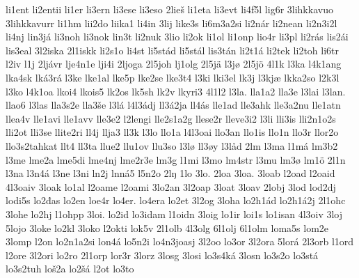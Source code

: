 {    li1ent
    li2entii
    li1er
    li3ern
    li3ese
    li3eso
    2lieš
    li1eta
    li3evt
    li4f5l
    lig6r
    3lihkkavuo
    3lihkkavurr
    li1hm
    lii2do
    liika1
    li4in
    3lij
    like3s
    li6m3a2si
    li2nár
    li2nean
    li2n3i2l
    li4nj
    lin3já
    li3noh
    li3nok
    lin3t
    li2nuk
    3lio
    li2ok
    li1ol
    li1onp
    lio4r
    li3pl
    li2rás
    lis2ái
    lis3eal
    3l2iska
    2l1iskk
    li2s1o
    li4st
    li5stád
    li5stál
    lis3tán
    li2t1á
    li2tek
    li2toh
    li6tr
    l2iv
    l1j
    2ljávr
    lje4n1e
    lji4i
    2ljoga
    2l5joh
    lj1olg
    2l5jä
    l3jø
    2l5jö
    4l1k
    l3ka
    l4k1ang
    lka4sk
    lká3rá
    l3ke
    lke1al
    lke5p
    lke2se
    lke3t4
    l3ki
    lki3el
    lk3j
    l3kjæ
    lkka2so
    l2k3l
    l3ko
    l4k1oa
    lkoi4
    lkois5
    lk2os
    lk5sh
    lk2v
    lkyri3
    4l1l2
    l3la.
    lla1a2
    lla3e
    l3lai
    l3lan.
    llao6
    l3las
    lla3s2e
    lla3še
    l3lá
    l4l3ádj
    ll3á2ja
    ll4ás
    lle1ad
    lle3ahk
    lle3a2nu
    lle1atn
    llea4v
    lle1avi
    lle1avv
    lle3e2
    l2lengi
    lle2s1a2g
    llese2r
    lleve3i2
    l3li
    lli3is
    lli2n1o2s
    lli2ot
    lli3se
    llite2ri
    ll4j
    llja3
    ll3k
    l3lo
    llo1a
    l4l3oai
    llo3an
    llo1is
    llo1n
    llo3r
    llor2o
    llo3s2tahkat
    llt4
    ll3ta
    llue2
    llu1ov
    llu3so
    l3lø
    ll3øy
    l3låd
    2lm
    l3ma
    l1má
    lm3b2
    l3me
    lme2a
    lme5di
    lme4nj
    lme2r3e
    lm3g
    l1mi
    l3mo
    lm4str
    l3mu
    lm3ø
    lm1ö
    2l1n
    l3na
    l3n4á
    l3ne
    l3ni
    ln2j
    lnná5
    l5n2o
    2lŋ
    1lo
    3lo.
    2loa
    3loa.
    3loab
    l2oad
    l2oaid
    4l3oaiv
    3loak
    lo1al
    l2oame
    l2oami
    3lo2an
    3l2oap
    3loat
    3loav
    2lobj
    3lod
    lod2dj
    lodi5s
    lo2đas
    lo2en
    loe4r
    lo4er.
    lo4era
    lo2et
    3l2og
    3loha
    lo2h1ád
    lo2h1á2j
    2l1ohc
    3lohe
    lo2hj
    l1ohpp
    3loi.
    lo2id
    lo3idam
    l1oidn
    3loig
    lo1ir
    loi1s
    lo1isan
    4l3oiv
    3loj
    5lojo
    3loke
    lo2kl
    3loko
    l2okti
    lok5v
    2l1olb
    4l3olg
    6l1olj
    6l1olm
    loma5s
    lom2e
    3lomp
    l2on
    lo2n1a2si
    lon4á
    lo5n2i
    lo4n3joasj
    3l2oo
    lo3or
    3l2ora
    5lorá
    2l3orb
    l1ord
    l2ore
    3l2ori
    lo2ro
    2l1orp
    lor3r
    3lorz
    3losg
    3losi
    lo3s4ká
    3losn
    lo3s2o
    lo3stá
    lo3s2tuh
    loš2a
    lo2šá
    l2ot
    lo3to
}
